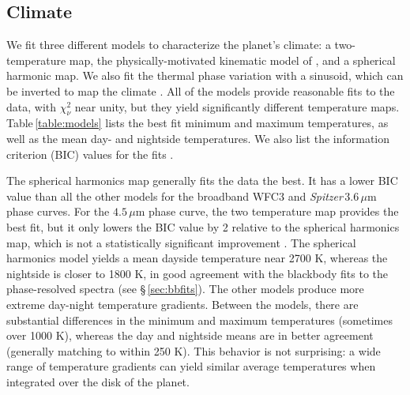 \documentclass[twocolumn, trackchanges]{aastex61}
\newcommand{\project}[1]{\textsl{#1}}
\newcommand{\Spitzer}{\project{Spitzer}}
\begin{document}
\subsection{Climate}
We fit three different models to characterize the planet's climate: a two-temperature map, the physically-motivated kinematic model of \cite{zhang17}, and a spherical harmonic map. We also fit the thermal phase variation with a sinusoid, which can be inverted to map the climate \citep{cowan08, cowan17}.  All of the models provide reasonable fits to the data, with $\chi^2_\nu$ near unity, but they yield significantly different temperature maps. Table\,\ref{table:models} lists the best fit minimum and maximum temperatures, as well as the mean day- and nightside temperatures. We also list the  information criterion (BIC) values for the fits \citep[a $\Delta$BIC value greater than 10 constitutes strong evidence against a given model;][]{kass95}.

The spherical harmonics map generally fits the data the best. It has a lower BIC value than all the other models for the broadband WFC3 and \Spitzer\,$3.6\,\mu$m phase curves. For the $4.5\,\mu$m phase curve, the two temperature map provides the best fit, but it only lowers the BIC value by 2 relative to the spherical harmonics map, which is not a statistically significant improvement \citep{kass95}.  The spherical harmonics model yields a mean dayside temperature near 2700 K, whereas the nightside is closer to 1800 K, in good agreement with the blackbody fits to the phase-resolved spectra (see \S\,\ref{sec:bbfits}).  The other models produce more extreme day-night temperature gradients.  Between the models, there are substantial differences in the minimum and maximum temperatures (sometimes over 1000 K), whereas the day and nightside means are in better agreement (generally matching to within 250 K). This behavior is not surprising: a wide range of temperature gradients can yield similar average temperatures when integrated over the disk of the planet.  
\end{document}
